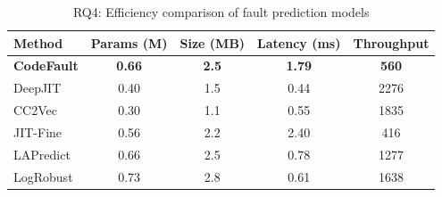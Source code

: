 
\begin{table}[t]
\centering
\caption{RQ4: Efficiency comparison of fault prediction models}
\label{tab:efficiency}
\begin{tabular}{lcccc}
\toprule
\textbf{Method} & \textbf{Params (M)} & \textbf{Size (MB)} & \textbf{Latency (ms)} & \textbf{Throughput} \\
\midrule
\textbf{CodeFault} & \textbf{0.66} & \textbf{2.5} & \textbf{1.79} & \textbf{560} \\
DeepJIT & 0.40 & 1.5 & 0.44 & 2276 \\
CC2Vec & 0.30 & 1.1 & 0.55 & 1835 \\
JIT-Fine & 0.56 & 2.2 & 2.40 & 416 \\
LAPredict & 0.66 & 2.5 & 0.78 & 1277 \\
LogRobust & 0.73 & 2.8 & 0.61 & 1638 \\

\bottomrule
\end{tabular}
\end{table}
